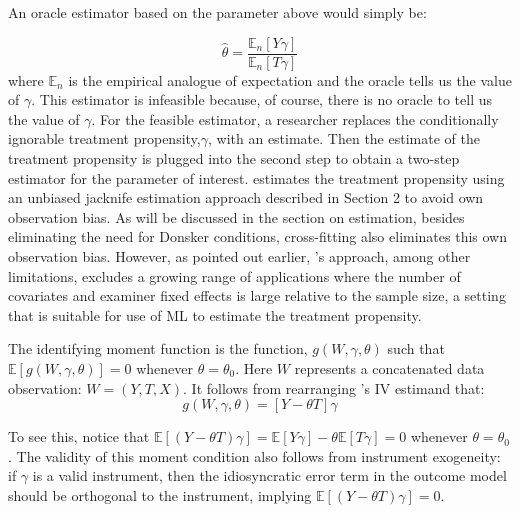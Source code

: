 An oracle estimator based on the parameter above would simply be:

\[\hat{\theta}=\frac{\mathbb{E}_n[Y \gamma]}{\mathbb{E}_n[T \gamma]}\]
where $\mathbb{E}_n$ is the empirical analogue of expectation and the oracle tells us the value of $\gamma$. This estimator is infeasible because, of course, there is no oracle to tell us the value of $\gamma$. For the feasible estimator, a researcher replaces the conditionally ignorable treatment propensity,$\gamma$, with an estimate. Then the estimate of the treatment propensity is plugged into the second step to obtain a two-step estimator for the parameter of interest. \citet{kolesarcowles} estimates the treatment propensity using an unbiased jacknife estimation approach described in Section 2 to avoid own observation bias. As will be discussed in the section on estimation, besides eliminating the need for Donsker conditions, cross-fitting also eliminates this own observation bias. However, as pointed out earlier, \citet{kolesarcowles}'s approach, among other limitations, excludes a growing range of applications where the number of covariates and examiner fixed effects is large relative to the sample size, a setting that is suitable for use of ML to estimate the treatment propensity. 

The identifying moment function is the function, $g (W, \gamma, \theta)$ such that $\mathbb{E}[g (W, \gamma, \theta)]=0$ whenever $\theta=\theta_0$. Here $W$ represents a concatenated data observation: $W=(Y,T,X)$. It follows from rearranging \citet{kolesarcowles}'s IV estimand that: $$g (W, \gamma, \theta)=[Y-\theta T]\gamma$$

To see this, notice that $\mathbb{E}[(Y-\theta T)\gamma]=\mathbb{E}[Y \gamma]-\theta \mathbb{E}[T \gamma]=0$ whenever $\theta=\theta_0$. The validity of this moment condition also follows from instrument exogeneity: if $\gamma$ is a valid instrument, then the idiosyncratic error term in the outcome model should be orthogonal to the instrument, implying $\mathbb{E}[(Y-\theta T) \gamma]=0$.

